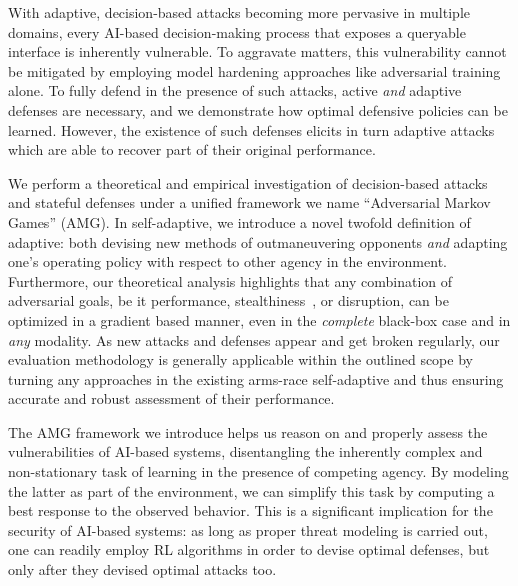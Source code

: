 With adaptive, decision-based attacks becoming more pervasive in multiple domains, every AI-based decision-making process that exposes a queryable interface is inherently vulnerable.
To aggravate matters, this vulnerability cannot be mitigated by employing model hardening approaches like adversarial training alone.
To fully defend in the presence of such attacks, active \emph{and} adaptive defenses are necessary, and we demonstrate how optimal defensive policies can be learned.
However, the existence of such defenses elicits in turn adaptive attacks which are able to recover part of their original performance.

We perform a theoretical and empirical investigation of decision-based attacks and stateful defenses under a unified framework we name ``Adversarial Markov Games'' (AMG).
In self-adaptive, we introduce a novel twofold definition of adaptive: both devising new methods of outmaneuvering opponents \textit{and} adapting one's operating policy with respect to other agency in the environment.
Furthermore, our theoretical analysis highlights that any combination of adversarial goals, be it performance, stealthiness~\cite{debenedetti2024evading}, or disruption, can be optimized in a gradient based manner, even in the \emph{complete} black-box case and in \emph{any} modality.
As new attacks and defenses appear and get broken regularly, our evaluation methodology is generally applicable within the outlined scope by turning any approaches in the existing arms-race self-adaptive and thus ensuring accurate and robust assessment of their performance.

The AMG framework we introduce helps us reason on and properly assess the vulnerabilities of AI-based systems, disentangling the inherently complex and non-stationary task of learning in the presence of competing agency.
By modeling the latter as part of the environment, we can simplify this task by computing a best response to the observed behavior.
This is a significant implication for the security of AI-based systems: as long as proper threat modeling is carried out, one can readily employ \gls{RL} algorithms in order to devise optimal defenses, but only after they devised optimal attacks too.